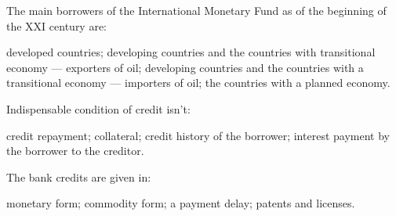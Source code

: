 \documentclass[12pt, table]{exam}
\begin{document}
\begin{questions}
\begin{multicols}{2}
\question The main borrowers of the International Monetary Fund as of the beginning of the XXI century are:
	 \begin{choices}
	 \choice developed countries;
	 \choice developing countries and the countries with transitional economy — exporters of oil;
	 \CC developing countries and the countries with a transitional economy — importers of oil;
	 \choice the countries with a planned economy.
	 \end{choices}
\question Indispensable condition of credit isn't:
	 \begin{choices}
	 \choice credit repayment;
	 \choice collateral;
	 \CC credit history of the borrower;
	 \choice interest payment by the borrower to the creditor.
	 \end{choices}
\question The bank credits are given in:
	 \begin{choices}
	 \CC monetary form;
	 \choice commodity form;
	 \choice a payment delay;
	 \choice patents and licenses.
	 \end{choices}



\end{multicols}
\end{questions}
\end{document}
